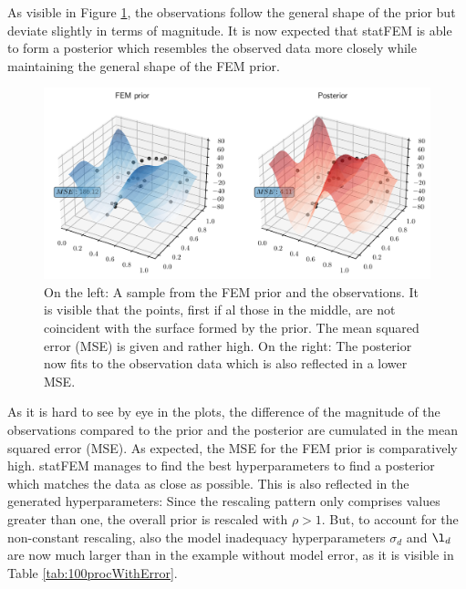 \documentclass[%
  a4paper,oneside,%
  11pt,%
  smallchapters,
  style=printdev,
  extramargin,
  green,%
  rgb, <cmyk>
  ]{tubsbook}
\begin{document}
As visible in Figure \ref{fig:ObservationPriorPost}, the observations follow the general shape of the prior but deviate slightly in terms of magnitude. It is now expected that statFEM is able to form a posterior which resembles the observed data more closely while maintaining the general shape of the FEM prior.
\begin{figure}[!ht]
\includegraphics[width=1\textwidth]{pics/3dTest.pdf}
\centering
\caption{On the left: A sample from the FEM prior and the observations. It is visible that the points, first if al those in the middle, are not coincident with the surface formed by the prior. The mean squared error (MSE) is given and rather high. On the right: The posterior now fits to the observation data which is also reflected in a lower MSE.}
\label{fig:ObservationPriorPost}
\end{figure}
As it is hard to see by eye in the plots, the difference of the magnitude of the observations compared to the prior and the posterior are cumulated in the mean squared error (MSE). As expected, the MSE for the FEM prior is comparatively high. statFEM manages to find the best hyperparameters to find a posterior which matches the data as close as possible. 
This is also reflected in the generated hyperparameters: Since the rescaling pattern only comprises values greater than one, the overall prior is rescaled with $\rho > 1$. But, to account for the non-constant rescaling, also the model inadequacy hyperparameters $\sigma_d$ and $\l_d$ are now much larger than in the example without model error, as it is visible in Table \ref{tab:100procWithError}.
\end{document}
